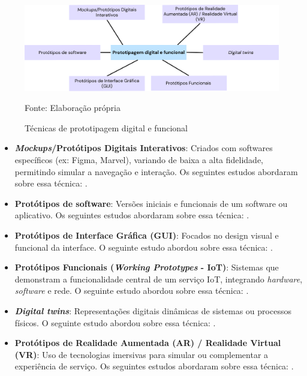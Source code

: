 \begin{figure}[H]
	\centering
	\includegraphics[width=1\linewidth]{figuras/digital-funcional}
	\caption{Técnicas de prototipagem digital e funcional}
	Fonte: Elaboração própria
	\label{fig:categorias-prototipacao}
\end{figure}

\begin{itemize}
	\item \textbf{\textit{Mockups}/Protótipos Digitais Interativos}:  Criados com softwares específicos (ex: Figma, Marvel), variando de baixa a alta fidelidade, permitindo simular a navegação e interação. Os seguintes estudos abordaram sobre essa técnica: .
	
	\item \textbf{Protótipos de software}: Versões iniciais e funcionais de um software ou aplicativo. Os seguintes estudos abordaram sobre essa técnica: .
	
	\item \textbf{Protótipos de Interface Gráfica (GUI)}: Focados no design visual e funcional da interface. O seguinte estudo abordou sobre essa técnica: .
	
	\item \textbf{Protótipos Funcionais (\textit{Working Prototypes} - IoT)}: Sistemas que demonstram a funcionalidade central de um serviço IoT, integrando \textit{hardware}, \textit{software} e rede. O seguinte estudo abordou sobre essa técnica: .
	
	\item \textbf{\textit{Digital twins}}: Representações digitais dinâmicas de sistemas ou processos físicos. O seguinte estudo abordou sobre essa técnica: .
	
	\item \textbf{Protótipos de Realidade Aumentada (AR) / Realidade Virtual (VR)}: Uso de tecnologias imersivas para simular ou complementar a experiência de serviço. Os seguintes estudos abordaram sobre essa técnica: .
\end{itemize}

